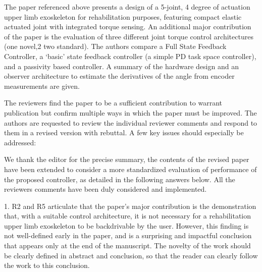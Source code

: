 \begin{editorpoint}
The paper referenced above presents a design of a 5-joint, 4 degree of
actuation upper limb exoskeleton for rehabilitation purposes, featuring
compact elastic actuated joint with integrated torque sensing. An
additional major contribution of the paper is the evaluation of three
different joint torque control architectures (one novel,2 two
standard). The authors compare a Full State Feedback Controller, a
`basic' state feedback controller (a simple PD task space controller),
and a passivity based controller. A summary of the hardware design and
an observer architecture to estimate the derivatives of the angle from
encoder measurements are given.

	The reviewers find the paper to be a sufficient contribution to
	warrant publication but confirm multiple ways in which the paper must
	be improved. The authors are requested to review the individual
	reviewer comments and respond to them in a revised version with
	rebuttal. A few key issues should especially be addressed:
	
 \end{editorpoint}


	
\begin{reply}
	We thank the editor for the precise summary, the contents of the revised paper have been extended to consider a more standardized evaluation of performance of the proposed controller, as detailed in the following answers below.
	All the reviewers comments have been duly considered and implemented.
	


\end{reply}


\begin{editorpoint}
	1. R2 and R5 articulate that the paper’s major contribution is the
	demonstration that, with a suitable control architecture, it is not
	necessary for a rehabilitation upper limb exoskeleton to be
	backdrivable by the user. However, this finding is not well-defined
	early in the paper, and is a surprising and impactful conclusion that
	appears only at the end of the manuscript. The novelty of the work
	should be clearly defined in abstract and conclusion, so that the
	reader can clearly follow the work to this conclusion.

	

	
\end{editorpoint}

